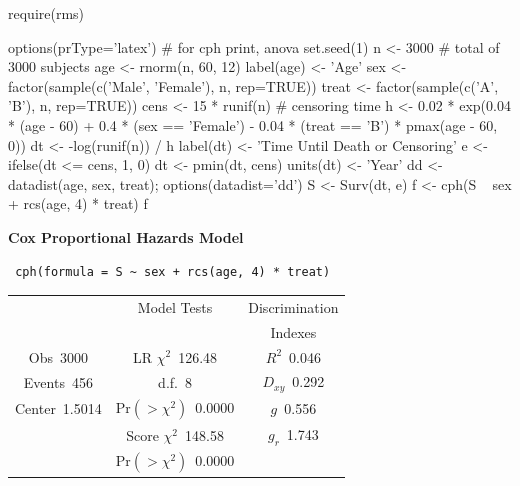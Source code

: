 \begin{Sinput}
require(rms)
\end{Sinput}
\begin{Sinput}
options(prType='latex')   # for cph print, anova
set.seed(1)
n <- 3000    # total of 3000 subjects
age <- rnorm(n, 60, 12)
label(age) <- 'Age'
sex   <- factor(sample(c('Male', 'Female'), n, rep=TRUE))
treat <- factor(sample(c('A', 'B'), n, rep=TRUE))
cens  <- 15 * runif(n)     # censoring time
h <- 0.02 * exp(0.04 * (age - 60) + 0.4 * (sex == 'Female') -  
                0.04 * (treat == 'B') * pmax(age - 60, 0))
dt <- -log(runif(n)) / h
label(dt) <- 'Time Until Death or Censoring'
e <- ifelse(dt <= cens, 1, 0)
dt <- pmin(dt, cens)
units(dt) <- 'Year'
dd <- datadist(age, sex, treat); options(datadist='dd')
S <- Surv(dt, e)
f <- cph(S ~ sex + rcs(age, 4) * treat)
f
\end{Sinput}

 \centerline{\textbf{Cox Proportional Hazards Model}}
 
 \begin{verbatim}
 cph(formula = S ~ sex + rcs(age, 4) * treat)
 \end{verbatim}
 
 {\selectfont \begin{center}\begin{tabular}{|c|c|c|}\hline
&Model Tests&Discrimination\\
&&Indexes\\\hline
Obs~\hfill 3000&LR $\chi^{2}$~\hfill 126.48&$R^{2}$~\hfill 0.046\\
Events~\hfill 456&d.f.~\hfill 8&$D_{xy}$~\hfill 0.292\\
Center~\hfill 1.5014&Pr$(>\chi^{2})$~\hfill 0.0000&$g$~\hfill 0.556\\
&Score $\chi^{2}$~\hfill 148.58&$g_{r}$~\hfill 1.743\\
&Pr$(>\chi^{2})$~\hfill 0.0000&\\
\hline
\end{tabular}
\end{center}}
 

